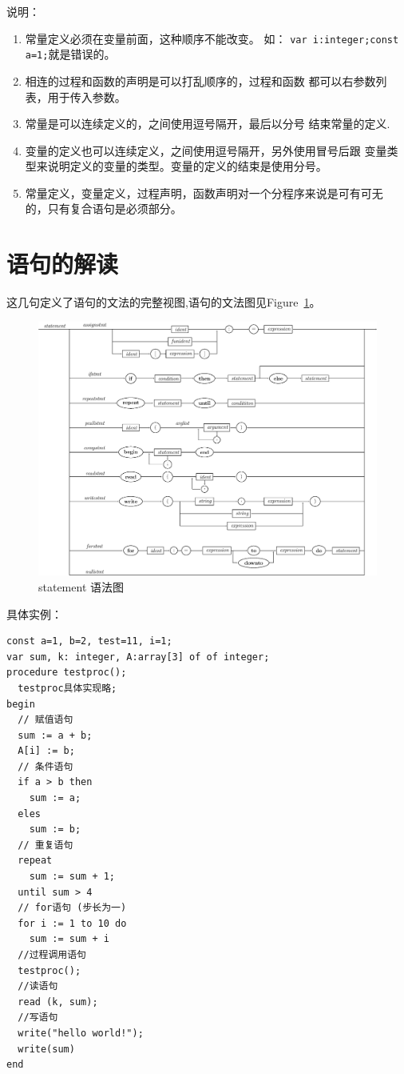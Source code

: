 说明：
\begin{enumerate}
	\item 常量定义必须在变量前面，这种顺序不能改变。
		如： \verb|var i:integer;const a=1;|就是错误的。
	\item 相连的过程和函数的声明是可以打乱顺序的，过程和函数
		都可以右参数列表，用于传入参数。
	\item 常量是可以连续定义的，之间使用逗号隔开，最后以分号
		结束常量的定义.
	\item 变量的定义也可以连续定义，之间使用逗号隔开，另外使用冒号后跟
		变量类型来说明定义的变量的类型。变量的定义的结束是使用分号。
	\item 常量定义，变量定义，过程声明，函数声明对一个分程序来说是可有可无
		的，只有复合语句是必须部分。
\end{enumerate}
\section{语句的解读}









这几句定义了语句的文法的完整视图,语句的文法图见Figure~\ref{statement}。
\begin{figure}[!h]
\begin{center}
    \includegraphics[scale=.6]{Figures/statement.eps}
\end{center}
\caption{statement 语法图}
\label{statement}
\end{figure}
具体实例：
\begin{verbatim}
const a=1, b=2, test=11, i=1;
var sum, k: integer, A:array[3] of of integer;
procedure testproc();
  testproc具体实现略;
begin
  // 赋值语句
  sum := a + b;
  A[i] := b;
  // 条件语句
  if a > b then
    sum := a;
  eles
    sum := b;
  // 重复语句
  repeat
    sum := sum + 1;
  until sum > 4
  // for语句 (步长为一)
  for i := 1 to 10 do
    sum := sum + i
  //过程调用语句
  testproc();
  //读语句
  read (k, sum);
  //写语句
  write("hello world!");
  write(sum)
end
\end{verbatim}
